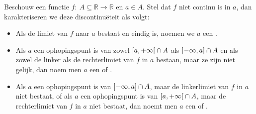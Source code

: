 \documentclass[main.tex]{subfiles}
\begin{document}
\begin{de}
  \label{de:classificatie-van-discontinuiteiten}
  Beschouw een functie $f:\ A \subseteq \mathbb{R} \rightarrow \mathbb{R}$ en $a\in A$.
  Stel dat $f$ niet continu is in $a$, dan karakteriseren we deze discontinu\"eteit als volgt:
  \begin{itemize}
  \item Als de limiet van $f$ naar $a$ bestaat en eindig is, noemen we $a$ een .
  \item Als $a$ een ophopingspunt is van zowel $\interval[open right]{a}{+\infty} \cap A$ als $\interval[open left]{-\infty}{a} \cap A$ en als zowel de linker als de rechterlimiet van $f$ in $a$ bestaan, maar ze zijn niet gelijk, dan noem men $a$ een  of .
  \item Als $a$ een ophopingspunt is van $\interval[open left]{-\infty}{a} \cap A$, maar de linkerlimiet van $f$ in $a$ niet bestaat, of als $a$ een ophopingspunt is van $\interval[open right]{a}{+\infty}\cap A$, maar de rechterlimiet van $f$ in $a$ niet bestaat, dan noemt men $a$ een  of .
  \end{itemize}
\end{de}
\end{document}

